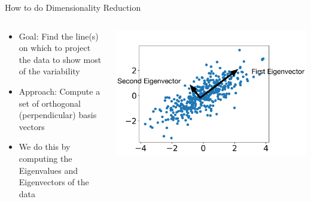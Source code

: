 \documentclass[aspectratio=169]{beamer}
\begin{document}
\begin{frame}{How to do Dimensionality Reduction}

\begin{columns}
\begin{column}{0.5\textwidth}
\begin{itemize}
\item Goal: Find the line(s) on which to project the data to show most of the variability
\item Approach: Compute a set of orthogonal (perpendicular) basis vectors
\item We do this by computing the Eigenvalues and Eigenvectors of the data
%
\end{itemize}
\end{column}
\begin{column}{0.5\textwidth}
\includegraphics[width=1\textwidth]{lectDimRed/Data2.pdf}
\end{column}
\end{columns}
\end{frame}
\end{document}

